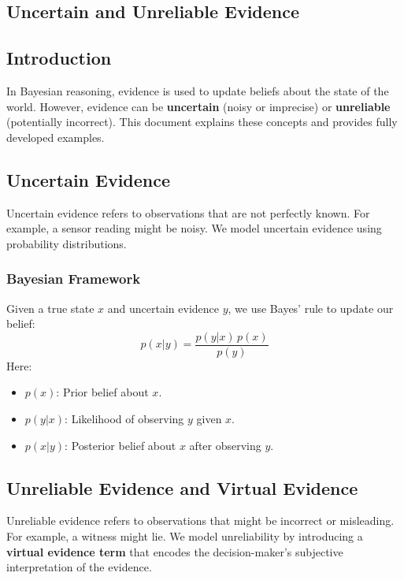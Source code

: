 \begin{notechapter}
\chapter{Uncertain and Unreliable Evidence}\label{ch:uncertain-evidence}

\section{Introduction}
In Bayesian reasoning, evidence is used to update beliefs about
the state of the world. However, evidence can be \textbf{uncertain}
(noisy or imprecise) or \textbf{unreliable} (potentially incorrect).
This document explains these concepts and provides fully developed
examples.

\section{Uncertain Evidence}
Uncertain evidence refers to observations that are not perfectly
known. For example, a sensor reading might be noisy. We model
uncertain evidence using probability distributions.

\subsection{Bayesian Framework}
Given a true state \( x \) and uncertain evidence \( y \), we use
Bayes' rule to update our belief:
\[
p(x | y) = \frac{p(y | x) \, p(x)}{p(y)}
\]
Here:
\begin{itemize}
    \item \( p(x) \): Prior belief about \( x \).
    \item \( p(y | x) \): Likelihood of observing \( y \) given \( x \).
    \item \( p(x | y) \): Posterior belief about \( x \) after observing \( y \).
\end{itemize}

\section{Unreliable Evidence and Virtual Evidence}
Unreliable evidence refers to observations that might be incorrect
or misleading. For example, a witness might lie. We model
unreliability by introducing a \textbf{virtual evidence term} that encodes
the decision-maker's subjective interpretation of the evidence.


\end{notechapter}
